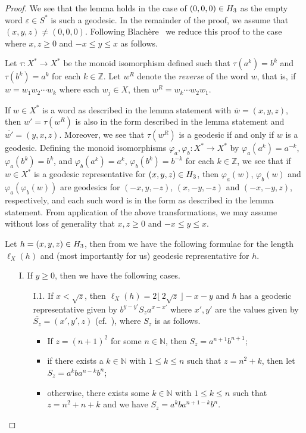 \begin{proof}
	We see that the lemma holds in the case of $(0,0,0) \in H_3$ as the empty word $\varepsilon \in S^*$ is such a geodesic.
	In the remainder of the proof, we assume that $(x,y,z) \neq (0,0,0)$.
	Following Blach\`ere~\cite[p.~22]{blachere2003} we reduce this proof to the case where $x,z \geq 0$ and $-x \leq y \leq x$ as follows.
	
	Let $\tau \colon X^* \to X^*$ be the monoid isomorphism defined such that $\tau(a^k)=b^k$ and $\tau(b^k)=a^k$ for each $k \in \mathbb{Z}$.
	Let $w^R$ denote the \emph{reverse} of the word $w$, that is, if $w = w_1 w_2 \cdots w_k$  where each $w_j \in X$, then $w^R = w_k \cdots w_2 w_1$.
	
	If $w \in X^*$ is a word as described in the lemma statement with $\overline{w} = (x,y,z)$, then $w'=  \tau(w^R)$ is also in the form described in the lemma statement and $\overline{w'} = (y,x,z)$.
	Moreover, we see that $\tau(w^R)$
	is a geodesic if and only if $w$ is a geodesic.
	Defining the monoid isomorphisms $\varphi_a,\varphi_b\colon X^* \to X^*$ by $\varphi_a(a^k) = a^{-k}$, $\varphi_a(b^k) = b^k$, and $\varphi_b(a^k) = a^{k}$, $\varphi_b(b^k) = b^{-k}$ for each $k \in \mathbb{Z}$, we see that if $w \in X^*$ is a geodesic representative for $(x,y,z) \in H_3$, then $\varphi_a(w)$, $\varphi_b(w)$ and $\varphi_a(\varphi_b(w))$ are geodesics for $(-x,y,-z)$, $(x,-y,-z)$ and $(-x,-y,z)$, respectively, and each such word is in the form as described in the lemma statement.
	From application of the above transformations, we may assume without loss of generality that $x,z \geq 0$ and $-x \leq y \leq x$.
	
	Let $h = (x,y,z) \in H_3$, then from \cite[Theorem~2.2]{blachere2003} we have the following formulae for the length $\ell_X(h)$ and (most importantly for us) geodesic representative for $h$.
	
	\begin{itemize}
		\item[I.]
		If $y \geq 0$, then we have the following cases.
		\begin{itemize}
			\item[I.1.]
			If $x < \sqrt{z}$, then $\ell_X(h) = 2\lfloor\,2\sqrt{z}\, \rfloor - x - y$
			and $h$ has a geodesic representative given by $b^{y-y'} S_z a^{x-x'}$ where $x',y'$ are the values given by $\overline{S_z} = (x',y',z)$ (cf.~\cite[p.~32]{blachere2003}), where $S_z$ is as follows.
			
			\begin{itemize}
				\item
				If $z = (n+1)^2$ for some $n \in \mathbb{N}$, then $S_z = a^{n+1} b^{n+1}$;
				\item 
				if there exists a $k \in \mathbb{N}$ with $1 \leq k \leq n$ such that $z = n^2 + k$, then let $S_z = a^k b a^{n-k} b^n$;
				\item
				otherwise, there exists some $k \in \mathbb{N}$ with $1 \leq k \leq n$ such that $z = n^2+n+k$ and we have $S_z = a^k b a^{n+1-k} b^n$.
			\end{itemize}
			

\end{itemize}
\end{itemize}
\end{proof}
